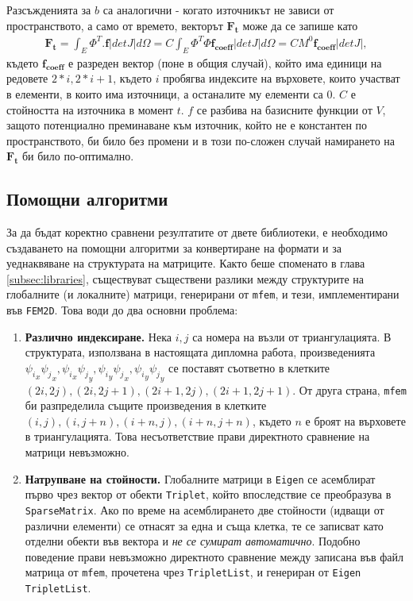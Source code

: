 \documentclass{report}
\begin{document}
	Разсъжденията за $b$ са аналогични - когато източникът не зависи от пространството, а само от времето, векторът $\mathbf{F_t}$ може да се запише като 
	\begin{align*}
		\mathbf{F_t}=\int_E\Phi^T.\mathbf{f}|detJ|d\Omega=C\int_E\Phi^T\Phi\mathbf{f_{coeff}}|detJ|d\Omega=CM^0\mathbf{f_{coeff}}|detJ|,
	\end{align*}
	където $\mathbf{f_{coeff}}$ е разреден вектор (поне в общия случай), който има единици на редовете $2*i, 2*i+1$, където $i$ пробягва индексите на върховете, които участват в елементи, в които има източници, а останалите му елементи са $0$. $C$ е стойността на източника в момент $t$. $f$ се разбива на базисните функции от $V$, защото потенциално преминаване към източник, който не е константен по пространството, би било без промени и в този по-сложен случай намирането на $\mathbf{F_t}$ би било по-оптимално.
	
	\subsection{Помощни алгоритми}\label{subsec:utils}
	За да бъдат коректно сравнени резултатите от двете библиотеки, е необходимо създаването на помощни алгоритми за конвертиране на формати и за уеднаквяване на структурата на матриците.	Както беше споменато в глава \ref{subsec:libraries}, съществуват съществени разлики между структурите на глобалните (и локалните) матрици, генерирани от \texttt{mfem}, и тези, имплементирани във \texttt{FEM2D}. Това води до два основни проблема:
	
	\begin{enumerate}
		\item \textbf{Различно индексиране.}
		Нека $i,j$ са номера на възли от триангулацията. В структурата, използвана в настоящата дипломна работа, произведенията ${\psi_i}_x{\psi_j}_x, {\psi_i}_x{\psi_j}_y, {\psi_i}_y{\psi_j}_x, {\psi_i}_y{\psi_j}_y$ се поставят съответно в клетките $(2i,2j), (2i,2j+1), (2i+1,2j), (2i+1,2j+1)$. 
		От друга страна, \texttt{mfem} би разпределила същите произведения в клетките $(i,j), (i,j+n), (i+n,j), (i+n,j+n)$, където $n$ е броят на върховете в триангулацията. Това несъответствие прави директното сравнение на матрици невъзможно.
		
		\item \textbf{Натрупване на стойности.}
		Глобалните матрици в \texttt{Eigen} се асемблират първо чрез вектор от обекти \texttt{Triplet}, който впоследствие се преобразува в \texttt{SparseMatrix}. Ако по време на асемблирането две стойности (идващи от различни елементи) се отнасят за една и съща клетка, те се записват като отделни обекти във вектора и \emph{не се сумират автоматично}. Подобно поведение прави невъзможно директното сравнение между записана във файл матрица от \texttt{mfem}, прочетена чрез \texttt{TripletList}, и генериран от \texttt{Eigen} \texttt{TripletList}.
	\end{enumerate}
	
\end{document}
